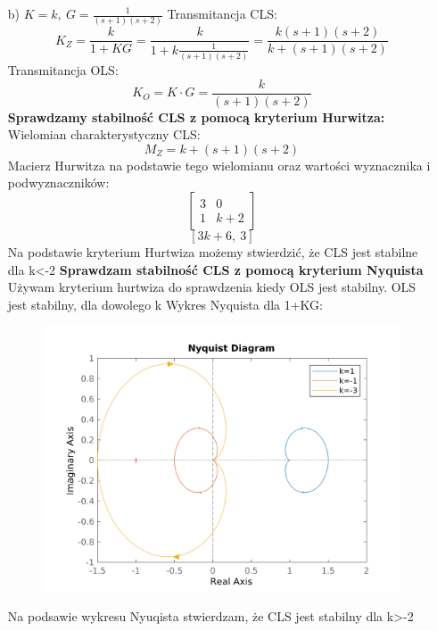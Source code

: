 \documentclass{article}
\begin{document}
\begin{itemize}
    \item[b)] $K=k, \ G=\frac{1}{\left(s + 1\right) \left(s + 2\right)}$
    Transmitancja CLS:
    $$K_Z=\frac{k}{1+KG}=\frac{k}{1+k\frac{1}{\left(s + 1\right) \left(s + 2\right)}}=\frac{k \left(s + 1\right) \left(s + 2\right)}{k + \left(s + 1\right) \left(s + 2\right)}$$
    Transmitancja OLS:
    $$K_O=K\cdot G=\frac{k}{\left(s + 1\right) \left(s + 2\right)}$$
    \textbf{Sprawdzamy stabilność CLS z pomocą kryterium Hurwitza:}\newline
    Wielomian charakterystyczny CLS:
    $$M_Z=k + \left(s + 1\right) \left(s + 2\right)$$
    Macierz Hurwitza na podstawie tego wielomianu oraz wartości wyznacznika i podwyznaczników:
    $$\left[\begin{matrix}3 & 0\\1 & k + 2\end{matrix}\right]$$
    $$\left[ 3 k + 6, \  3\right]$$
    Na podstawie kryterium Hurtwiza możemy stwierdzić, że CLS jest stabilne dla k<-2
    \newline\textbf{Sprawdzam stabilność CLS z pomocą kryterium Nyquista}\newline
    Używam kryterium hurtwiza do sprawdzenia kiedy OLS jest stabilny. OLS jest stabilny, dla dowolego k
    Wykres Nyquista dla 1+KG:
    \begin{figure}
        \includegraphics[scale=0.8]{b.png}
        \centering
    \end{figure}
    Na podsawie wykresu Nyuqista stwierdzam, że CLS jest stabilny dla k>-2
    \newpage
    

\end{itemize}
\end{document}
